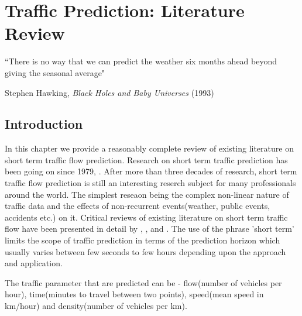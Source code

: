 
\chapter{Traffic Prediction: Literature Review}

\label{Chapter2}


{``There is no way that we can predict the weather six months ahead beyond giving the seasonal
average"}
\begin{flushright}
Stephen Hawking, \textit{Black Holes and Baby Universes} (1993)
\end{flushright}

\section{Introduction}
In this chapter we provide a reasonably complete review of existing literature on short term
traffic flow prediction. Research on short term traffic prediction has been going on since 1979,
\citet{ahmed1979analysis}. After more than three decades of research, short term traffic flow
prediction is still an interesting reserch subject for many professionals around the world. The
simplest reseaon being the complex non-linear nature of traffic data and the effects of
non-recurrent events(weather, public events, accidents etc.) on it.  Critical reviews of existing
literature on short term traffic flow have been presented in detail by \citet{smith1997traffic},
\citet{vlahogianni2004short}, \citet{van2012short} and \citet{vlahogianni2014short}. The use of
the phrase 'short term' limits the scope of traffic prediction in terms of the prediction horizon
which usually varies between few seconds to few hours depending upon the approach and application.

The traffic parameter that are predicted can be - flow(number of vehicles per hour), time(minutes
to travel between two points), speed(mean speed in km/hour) and density(number of vehicles per km).

